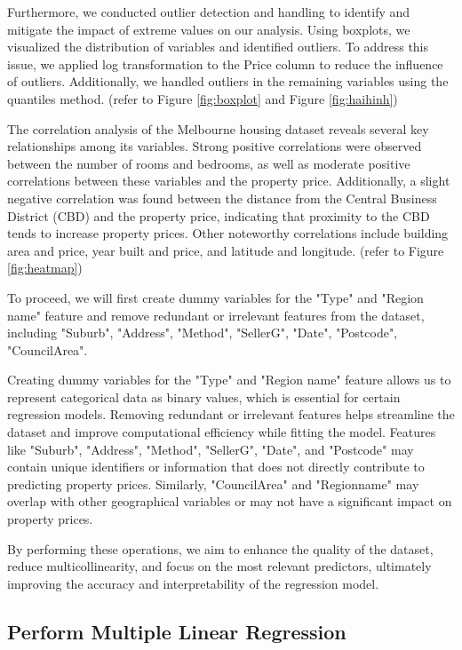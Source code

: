 \documentclass[12pt,doublespace]{article}
\begin{document}
	Furthermore, we conducted outlier detection and handling to identify and mitigate the impact of extreme values on our analysis. Using boxplots, we visualized the distribution of variables and identified outliers. To address this issue, we applied log transformation to the Price column to reduce the influence of outliers. Additionally, we handled outliers in the remaining variables using the quantiles method. (refer to Figure \ref{fig:boxplot} and Figure \ref{fig:haihinh})
		
	The correlation analysis of the Melbourne housing dataset reveals several key relationships among its variables. Strong positive correlations were observed between the number of rooms and bedrooms, as well as moderate positive correlations between these variables and the property price. Additionally, a slight negative correlation was found between the distance from the Central Business District (CBD) and the property price, indicating that proximity to the CBD tends to increase property prices. Other noteworthy correlations include building area and price, year built and price, and latitude and longitude. (refer to Figure \ref{fig:heatmap})
	
	To proceed, we will first create dummy variables for the "Type" and "Region name" feature and remove redundant or irrelevant features from the dataset, including "Suburb", "Address", "Method", "SellerG", "Date", "Postcode", "CouncilArea".
	
	Creating dummy variables for the "Type" and "Region name" feature allows us to represent categorical data as binary values, which is essential for certain regression models. Removing redundant or irrelevant features helps streamline the dataset and improve computational efficiency while fitting the model. Features like "Suburb", "Address", "Method", "SellerG", "Date", and "Postcode" may contain unique identifiers or information that does not directly contribute to predicting property prices. Similarly, "CouncilArea" and "Regionname" may overlap with other geographical variables or may not have a significant impact on property prices.
	
	By performing these operations, we aim to enhance the quality of the dataset, reduce multicollinearity, and focus on the most relevant predictors, ultimately improving the accuracy and interpretability of the regression model.
	
	\subsection{Perform Multiple Linear Regression}
	
\end{document}
